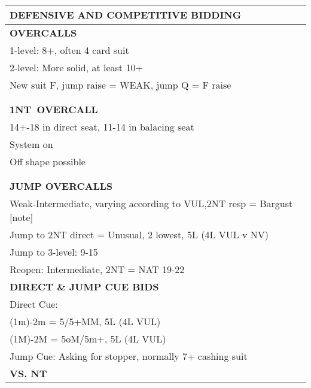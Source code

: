 \documentclass{article}
\newcommand\N{{\footnotesize NT}}
\begin{document}
\noindent
\small{
\begin{minipage}{90mm}
	\begin{tabular}{| p{88mm} |}
		\hline
		\cellcolor{green!25} \textbf{DEFENSIVE AND COMPETITIVE BIDDING} \\ \hline
		\cellcolor{orange!25}\textbf{OVERCALLS} \\ \hline
		1-level: 8+, often 4 card suit\\ \hline
		2-level: More solid, at least 10+\\ \hline
		New suit F, jump raise = WEAK, jump Q = F raise\\ \hline
		\\ \hline
		\\ \hline
		\cellcolor{orange!25}\textbf{1\N \ OVERCALL} \\ \hline
		14+-18 in direct seat, 11-14 in balacing seat\\ \hline
		System on\\ \hline
		Off shape possible\\ \hline
		\\ \hline
		\\ \hline
		\cellcolor{orange!25}\textbf{JUMP OVERCALLS} \\ \hline
		Weak-Intermediate, varying according to VUL,2{\N} resp = Bargust [note]\\ \hline
		Jump to 2{\N} direct = Unusual, 2 lowest, 5L (4L VUL v NV)\\ \hline
		Jump to 3-level: 9-15\\ \hline
		Reopen: Intermediate, 2{\N} = NAT 19-22\\ \hline
		\cellcolor{orange!25}\textbf{DIRECT \& JUMP CUE BIDS} \\ \hline
		Direct Cue:\\ \hline
		(1m)-2m = 5/5+MM, 5L (4L VUL)\\ \hline
		(1M)-2M = 5oM/5m+, 5L (4L VUL)\\ \hline
		Jump Cue: Asking for stopper, normally 7+ cashing suit\\ \hline
		\cellcolor{orange!25}\textbf{VS. NT} \\ \hline

\end{tabular}
\end{minipage}}
\end{document}
